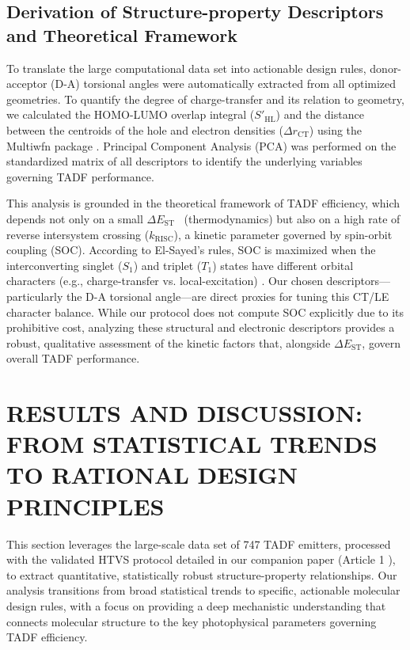 \documentclass[journal=jcisd8,manuscript=article,keywords=true]{achemso}
\newcommand{\deltaest}{$\Delta E_{\text{ST}}$}
\begin{document}
\subsection{Derivation of Structure-property Descriptors and Theoretical Framework}

To translate the large computational data set into actionable design rules, donor-acceptor (D-A) torsional angles were automatically extracted from all optimized geometries. To quantify the degree of charge-transfer and its relation to geometry, we calculated the HOMO-LUMO overlap integral ($S'_{\text{HL}}$) and the distance between the centroids of the hole and electron densities ($\Delta r_{\text{CT}}$) using the Multiwfn package \cite{lu2024multiwfn, Etienne2014}. Principal Component Analysis (PCA) was performed on the standardized matrix of all descriptors to identify the underlying variables governing TADF performance.

This analysis is grounded in the theoretical framework of TADF efficiency, which depends
not only on a small \deltaest~ (thermodynamics) but also on a high rate of reverse
intersystem crossing ($k_{\text{RISC}}$), a kinetic parameter governed by spin-orbit
coupling (SOC). According to El-Sayed's rules, SOC is maximized when the interconverting
singlet ($S_1$) and triplet ($T_1$) states have different orbital characters (e.g.,
charge-transfer vs. local-excitation) \cite{El-Sayed-Rules-1968,
Li_2022_10_1016_j_orgel_2022_106645}. Our chosen descriptors—particularly the D-A
torsional angle—are direct proxies for tuning this CT/LE character balance. While our
protocol does not compute SOC explicitly due to its prohibitive cost, analyzing these
structural and electronic descriptors provides a robust, qualitative assessment of the
kinetic factors that, alongside \deltaest, govern overall TADF performance.

\section{RESULTS AND DISCUSSION: FROM STATISTICAL TRENDS TO RATIONAL DESIGN PRINCIPLES}
\label{sec:Res_Disc}

This section leverages the large-scale data set of \num{747} TADF emitters, processed with the validated HTVS protocol detailed in our companion paper (Article 1 \cite{TchapetArxivA1-2025}), to extract quantitative, statistically robust structure-property relationships. Our analysis transitions from broad statistical trends to specific, actionable molecular design rules, with a focus on providing a deep mechanistic understanding that connects molecular structure to the key photophysical parameters governing TADF efficiency.
\end{document}
